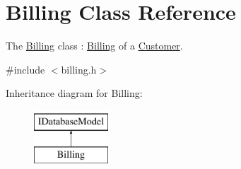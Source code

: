 \hypertarget{classBilling}{\section{Billing Class Reference}
\label{classBilling}
}


The \hyperlink{classBilling}{Billing} class \-: \hyperlink{classBilling}{Billing} of a \hyperlink{classCustomer}{Customer}.  




{\ttfamily \#include $<$billing.\-h$>$}

Inheritance diagram for Billing\-:\begin{figure}[H]
\begin{center}
\leavevmode
\includegraphics[height=2.000000cm]{df/d81/classBilling}
\end{center}
\end{figure}
